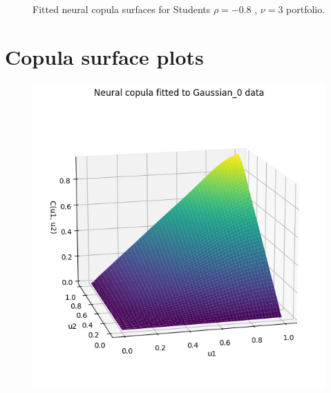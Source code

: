 \documentclass[%
a4paper,							
11pt,								
bibliography=totoc,						
abstracton=true					
]
{scrartcl}
\theoremstyle{plain}
\theoremstyle{definition}
\theoremstyle{remark}
\newcommand{\1}{\mathbbm{1}}
\begin{document}
\begin{figure}[H]
\begin{minipage}{0.4\textwidth}
    \end{minipage}
    \caption{Fitted neural copula surfaces for Students $\rho=-0.8$ , $\nu = 3$ portfolio.}
    \label{fig:GeneratedDataStudents}
\end{figure}



\newpage
\section{Copula surface plots}\label{sec:CopulaSurfacesPlots}
\begin{figure}[H]
    \centering
    \begin{minipage}{0.45\textwidth}
        \centering
        \includegraphics[width=\textwidth]{5ResultsDiscussion/pictures/PortfolioTest/CopulaSurface1.png}
    \end{minipage}
    \hfill
    \begin{minipage}{0.45\textwidth}
        \centering

\end{minipage}
\end{figure}
\end{document}
